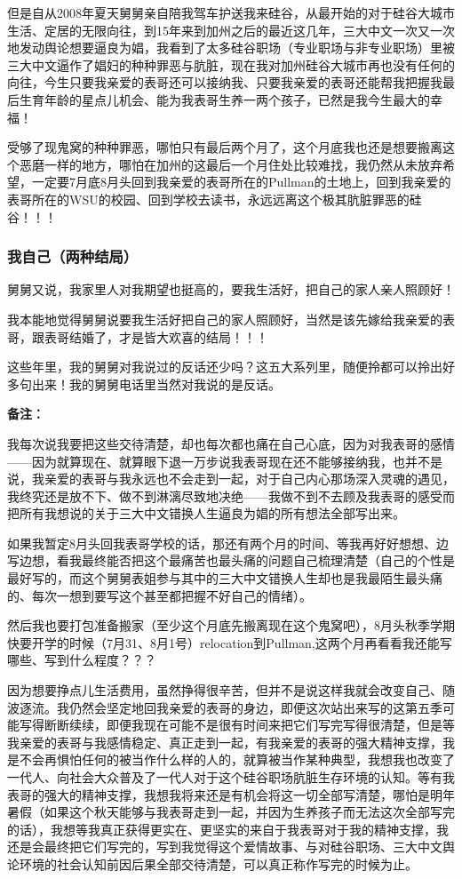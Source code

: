 \documentclass[9pt, b5paper]{article}
\begin{document}
但是自从2008年夏天舅舅亲自陪我驾车护送我来硅谷，从最开始的对于硅谷大城市生活、定居的无限向往，到15年来到加州之后的最近这几年，三大中文一次又一次地发动舆论想要逼良为娼，我看到了太多硅谷职场（专业职场与非专业职场）里被三大中文逼作了娼妇的种种罪恶与肮脏，现在我对加州硅谷大城市再也没有任何的向往，今生只要我亲爱的表哥还可以接纳我、只要我亲爱的表哥还能帮我把握我最后生育年龄的星点儿机会、能为我表哥生养一两个孩子，已然是我今生最大的幸福！

受够了现鬼窝的种种罪恶，哪怕只有最后两个月了，这个月底我也还是想要搬离这个恶磨一样的地方，哪怕在加州的这最后一个月住处比较难找，我仍然从未放弃希望，一定要7月底8月头回到我亲爱的表哥所在的Pullman的土地上，回到我亲爱的表哥所在的WSU的校园、回到学校去读书，永远远离这个极其肮脏罪恶的硅谷！！！

\subsubsection{我自己（两种结局）}
\label{sec:org64ad370}


舅舅又说，我家里人对我期望也挺高的，要我生活好，把自己的家人亲人照顾好！

我本能地觉得舅舅说要我生活好把自己的家人照顾好，当然是该先嫁给我亲爱的表哥，跟表哥结婚了，才是皆大欢喜的结局！！！

这些年里，我的舅舅对我说过的反话还少吗？这五大系列里，随便拎都可以拎出好多句出来！我的舅舅电话里当然对我说的是反话。 

\textbf{备注：}

我每次说我要把这些交待清楚，却也每次都也痛在自己心底，因为对我表哥的感情——因为就算现在、就算眼下退一万步说我表哥现在还不能够接纳我，也并不是说，我亲爱的表哥与我永远也不会走到一起，对于自己内心那场深入灵魂的遇见，我终究还是放不下、做不到淋漓尽致地决绝——我做不到不去顾及我表哥的感受而把所有我想说的关于三大中文错换人生逼良为娼的所有想法全部写出来。

如果我暂定8月头回我表哥学校的话，那还有两个月的时间、等我再好好想想、边写边想，看我最终能否把这个最痛苦也最头痛的问题自己梳理清楚（自己的个性是最好写的，而这个舅舅表姐参与其中的三大中文错换人生却也是我最陌生最头痛的、每次一想到要写这个甚至都把握不好自己的情绪）。

然后我也要打包准备搬家（至少这个月底先搬离现在这个鬼窝吧），8月头秋季学期快要开学的时候（7月31、8月1号）relocation到Pullman,这两个月再看看我还能写哪些、写到什么程度？？？

因为想要挣点儿生活费用，虽然挣得很辛苦，但并不是说这样我就会改变自己、随波逐流。我仍然会坚定地回我亲爱的表哥的身边，即便这次站出来写的这第五季可能写得断断续续，即便我现在可能不是很有时间来把它们写完写得很清楚，但是等我亲爱的表哥与我感情稳定、真正走到一起，有我亲爱的表哥的强大精神支撑，我是不会再惧怕任何的被当作什么样的人的，就算被当作某种典型，我想我也改变了一代人、向社会大众普及了一代人对于这个硅谷职场肮脏生存环境的认知。等有我表哥的强大的精神支撑，我想我将来还是有机会将这一切全部写清楚，哪怕是明年暑假（如果这个秋天能够与我表哥走到一起，并因为生养孩子而无法这次全部写完的话），我想等我真正获得更实在、更坚实的来自于我表哥对于我的精神支撑，我还是会最终把它们写完的，写到我觉得这个爱情故事、与对硅谷职场、三大中文舆论环境的社会认知前因后果全部交待清楚，可以真正称作写完的时候为止。 
\end{document}
